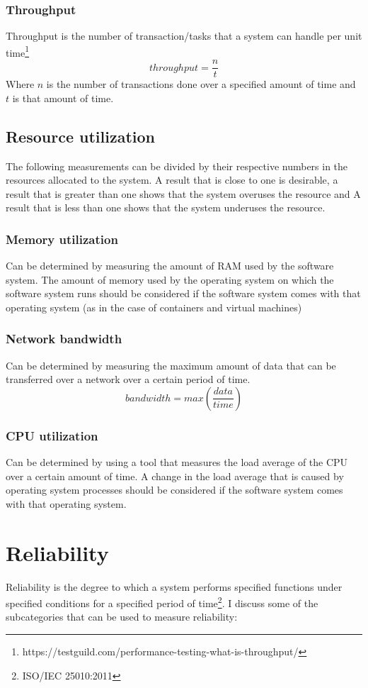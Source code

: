 \documentclass[11pt,a4paper]{article}
\def \iso{\footnote{ISO/IEC 25010:2011}}
\begin{document}
\subsubsection{Throughput}
Throughput is the number of transaction/tasks that a system can handle per unit
time\footnote{https://testguild.com/performance-testing-what-is-throughput/}
\[throughput = \frac{n}{t}\]
Where $n$ is the number of transactions done over a specified amount of time and $t$ is that amount of time.

\subsection{Resource utilization}
The following measurements can be divided by their respective numbers in the resources allocated to the system. A result
that is close to one is desirable, a result that is greater than one shows that the system overuses the resource and A
result that is less than one shows that the system underuses the resource.

\subsubsection{Memory utilization}
Can be determined by measuring the amount of RAM used by the software system. The amount of memory used by the operating
system on which the software system runs should be considered if the software system comes with that operating system
(as in the case of containers and virtual machines)

\subsubsection{Network bandwidth}
Can be determined by measuring the maximum amount of data that can be transferred over a network over a certain
period of time.
\[bandwidth = max(\frac{data}{time})\]

\subsubsection{CPU utilization}
Can be determined by using a tool that measures the load average of the CPU over a certain amount of time. A change in the
load average that is caused by operating system processes should be considered if the software system comes
with that operating system.

\section{Reliability}
Reliability is the degree to which a system performs specified functions under specified conditions for a specified period of
time\iso. I discuss some of the subcategories that can be used to measure reliability:
\end{document}
